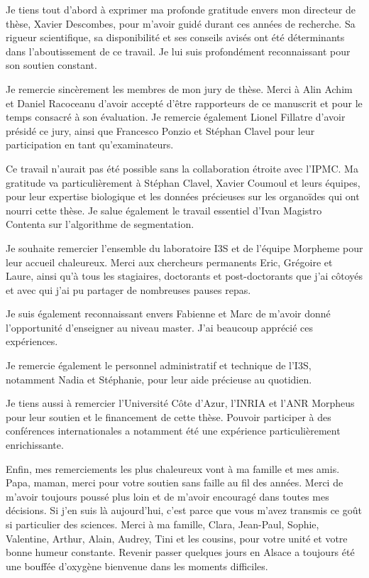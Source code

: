 
\begin{remerciements}

Je tiens tout d'abord à exprimer ma profonde gratitude envers mon directeur de thèse, Xavier Descombes, pour m'avoir guidé durant ces années de recherche. Sa rigueur scientifique, sa disponibilité et ses conseils avisés ont été déterminants dans l'aboutissement de ce travail. Je lui suis profondément reconnaissant pour son soutien constant.

Je remercie sincèrement les membres de mon jury de thèse. Merci à Alin Achim et Daniel Racoceanu d'avoir accepté d'être rapporteurs de ce manuscrit et pour le temps consacré à son évaluation. Je remercie également Lionel Fillatre d'avoir présidé ce jury, ainsi que Francesco Ponzio et Stéphan Clavel pour leur participation en tant qu'examinateurs.

Ce travail n'aurait pas été possible sans la collaboration étroite avec l'IPMC. Ma gratitude va particulièrement à Stéphan Clavel, Xavier Coumoul et leurs équipes, pour leur expertise biologique et les données précieuses sur les organoïdes qui ont nourri cette thèse. Je salue également le travail essentiel d'Ivan Magistro Contenta sur l'algorithme de segmentation.

Je souhaite remercier l'ensemble du laboratoire I3S et de l'équipe Morpheme pour leur accueil chaleureux. Merci aux chercheurs permanents Eric, Grégoire et Laure, ainsi qu'à tous les stagiaires, doctorants et post-doctorants que j'ai côtoyés et avec qui j'ai pu partager de nombreuses pauses repas.

Je suis également reconnaissant envers Fabienne et Marc de m'avoir donné l'opportunité d'enseigner au niveau master. J'ai beaucoup apprécié ces expériences.

Je remercie également le personnel administratif et technique de l'I3S, notamment Nadia et Stéphanie, pour leur aide précieuse au quotidien.

Je tiens aussi à remercier l'Université Côte d'Azur, l'INRIA et l'ANR Morpheus pour leur soutien et le financement de cette thèse. Pouvoir participer à des conférences internationales a notamment été une expérience particulièrement enrichissante.


\vspace{0.5cm}




Enfin, mes remerciements les plus chaleureux vont à ma famille et mes amis. Papa, maman, merci pour votre soutien sans faille au fil des années. Merci de m'avoir toujours poussé plus loin et de m'avoir encouragé dans toutes mes décisions. Si j'en suis là aujourd'hui, c'est parce que vous m'avez transmis ce goût si particulier des sciences. Merci à ma famille, Clara, Jean-Paul, Sophie, Valentine, Arthur, Alain, Audrey, Tini et les cousins, pour votre unité et votre bonne humeur constante. Revenir passer quelques jours en Alsace a toujours été une bouffée d'oxygène bienvenue dans les moments difficiles.


\end{remerciements}
